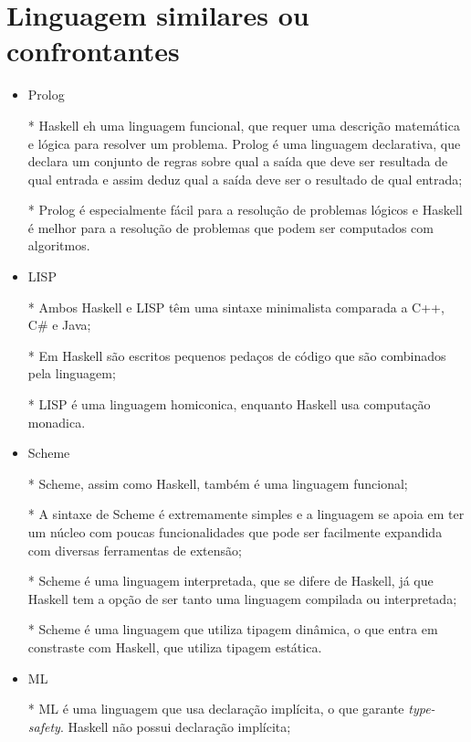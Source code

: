 \documentclass[
  12pt,				         %
  oneside,			       %
  a4paper,			       %
  english,		       	 %
  brazil,			      	 %
]{abntex2}
\begin{document}
    \newpage

    \chapter{Linguagem similares ou confrontantes}

    \begin{itemize}
      \item Prolog
      
      * Haskell eh uma linguagem funcional, que requer uma descrição matemática e lógica para resolver um problema. Prolog é uma linguagem declarativa, 
      que declara um conjunto de regras sobre qual a saída que deve ser resultada de qual entrada e assim deduz qual a saída deve ser o resultado de qual entrada;

      * Prolog é especialmente fácil para a resolução de problemas lógicos e Haskell é melhor para a resolução de problemas que podem ser computados com algoritmos.

      \item LISP 
      
      * Ambos Haskell e LISP têm uma sintaxe minimalista comparada a C++, C\# e Java;

      * Em Haskell são escritos pequenos pedaços de código que são combinados pela linguagem;

      * LISP é uma linguagem homiconica, enquanto Haskell usa computação monadica.

      \item Scheme 
      
      * Scheme, assim como Haskell, também é uma linguagem funcional;

      * A sintaxe de Scheme é extremamente simples e a linguagem se apoia em ter um núcleo com poucas funcionalidades que pode ser 
      facilmente expandida com diversas ferramentas de extensão;

      * Scheme é uma linguagem interpretada, que se difere de Haskell, já que Haskell tem a opção de ser tanto uma linguagem compilada ou interpretada;

      * Scheme é uma linguagem que utiliza tipagem dinâmica, o que entra em constraste com Haskell, que utiliza tipagem estática.

      \item ML 
      
      * ML é uma linguagem que usa declaração implícita, o que garante \emph{type-safety}. Haskell não possui declaração implícita;


\end{itemize}
\end{document}
